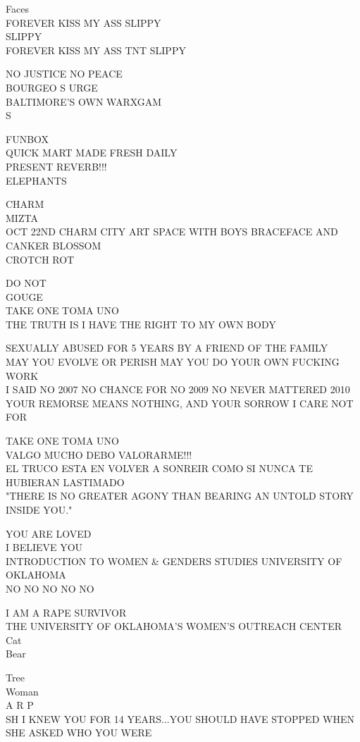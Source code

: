\documentclass[10pt,letterpaper]{article}
\begin{document}
Faces\\
FOREVER KISS MY ASS SLIPPY\\
SLIPPY\\
FOREVER KISS MY ASS TNT SLIPPY

NO JUSTICE NO PEACE\\
BOURGEO S URGE\\
BALTIMORE'S OWN WARXGAM\\
S

FUNBOX\\
QUICK MART MADE FRESH DAILY\\
PRESENT REVERB!!!\\
ELEPHANTS

CHARM\\
MIZTA\\
OCT 22ND CHARM CITY ART SPACE WITH BOYS BRACEFACE AND CANKER BLOSSOM\\
CROTCH ROT

DO NOT\\
GOUGE\\
TAKE ONE TOMA UNO\\
THE TRUTH IS I HAVE THE RIGHT TO MY OWN BODY

SEXUALLY ABUSED FOR 5 YEARS BY A FRIEND OF THE FAMILY\\
MAY YOU EVOLVE OR PERISH MAY YOU DO YOUR OWN FUCKING WORK\\
I SAID NO 2007 NO CHANCE FOR NO 2009 NO NEVER MATTERED 2010\\
YOUR REMORSE MEANS NOTHING, AND YOUR SORROW I CARE NOT FOR

TAKE ONE TOMA UNO\\
VALGO MUCHO DEBO VALORARME!!!\\
EL TRUCO ESTA EN VOLVER A SONREIR COMO SI NUNCA TE HUBIERAN LASTIMADO\\
"THERE IS NO GREATER AGONY THAN BEARING AN UNTOLD STORY INSIDE YOU."

YOU ARE LOVED\\
I BELIEVE YOU\\
INTRODUCTION TO WOMEN \& GENDERS STUDIES UNIVERSITY OF OKLAHOMA\\
NO NO NO NO NO

I AM A RAPE SURVIVOR\\
THE UNIVERSITY OF OKLAHOMA'S WOMEN'S OUTREACH CENTER\\
Cat\\
Bear

Tree\\
Woman\\
A R P\\
SH I KNEW YOU FOR 14 YEARS...YOU SHOULD HAVE STOPPED WHEN SHE ASKED WHO YOU WERE
\end{document}
